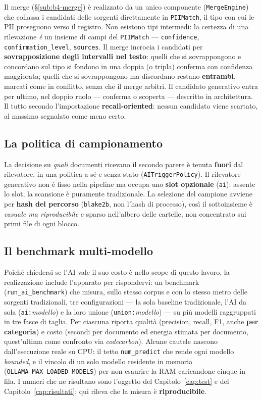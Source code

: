 Il merge (§\ref{sub:b4-merge}) è realizzato da un unico componente (\texttt{MergeEngine}) che collassa i candidati delle sorgenti direttamente in \texttt{PIIMatch}, il tipo con cui le PII proseguono verso il registro. Non esistono tipi intermedi: la certezza di una rilevazione \emph{è} un insieme di campi del \texttt{PIIMatch} --- \texttt{confidence}, \texttt{confirmation\_level}, \texttt{sources}. Il merge incrocia i candidati per \textbf{sovrapposizione degli intervalli nel testo}: quelli che si sovrappongono e concordano sul tipo si fondono in una doppia (o tripla) conferma con confidenza maggiorata; quelli che si sovrappongono ma discordano restano \textbf{entrambi}, marcati come in conflitto, senza che il merge arbitri. Il candidato generativo entra per ultimo, nel doppio ruolo --- conferma o scoperta --- descritto in architettura. Il tutto secondo l'impostazione \textbf{recall-oriented}: nessun candidato viene scartato, al massimo segnalato come meno certo.

\subsection{La politica di campionamento}
\label{sub:impl-ai-policy}

La decisione su \emph{quali} documenti ricevano il secondo parere è tenuta \textbf{fuori} dal rilevatore, in una politica a sé e senza stato (\texttt{AITriggerPolicy}). Il rilevatore generativo non è fisso nella pipeline ma occupa uno \textbf{slot opzionale} (\texttt{ai}): assente lo slot, la scansione è puramente tradizionale. La selezione del campione avviene per \textbf{hash del percorso} (\texttt{blake2b}, non l'hash di processo), così il sottoinsieme è \emph{casuale ma riproducibile} e sparso nell'albero delle cartelle, non concentrato sui primi file di ogni blocco.

\subsection{Il benchmark multi-modello}
\label{sub:impl-ai-benchmark}

Poiché chiedersi se l'AI vale il suo costo è nello scope di questo lavoro, la realizzazione include l'apparato per rispondervi: un benchmark (\texttt{run\_ai\_benchmark}) che misura, sullo stesso corpus e con lo stesso metro delle sorgenti tradizionali, tre configurazioni --- la sola baseline tradizionale, l'AI da sola (\texttt{ai:}\emph{modello}) e la loro unione (\texttt{union:}\emph{modello}) --- su più modelli raggruppati in tre fasce di taglia. Per ciascuna riporta qualità (precision, recall, F1, anche \textbf{per categoria}) e costo (secondi per documento ed energia stimata per documento, quest'ultima come confronto via \emph{codecarbon}). Alcune cautele nascono dall'esecuzione reale su CPU: il tetto \texttt{num\_predict} che rende ogni modello \emph{bounded}, e il vincolo di un solo modello residente in memoria (\texttt{OLLAMA\_MAX\_LOADED\_MODELS}) per non esaurire la RAM caricandone cinque in fila. I numeri che ne risultano sono l'oggetto del Capitolo~\ref{cap:test} e del Capitolo~\ref{cap:risultati}; qui rileva che la misura è \textbf{riproducibile}.


